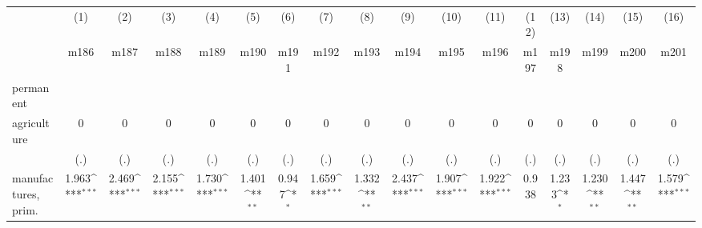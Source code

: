 {
\def\sym#1{\ifmmode^{#1}\else\(^{#1}\)\fi}
\begin{tabular}{l*{16}{c}}
\hline\hline
                    &\multicolumn{1}{c}{(1)}&\multicolumn{1}{c}{(2)}&\multicolumn{1}{c}{(3)}&\multicolumn{1}{c}{(4)}&\multicolumn{1}{c}{(5)}&\multicolumn{1}{c}{(6)}&\multicolumn{1}{c}{(7)}&\multicolumn{1}{c}{(8)}&\multicolumn{1}{c}{(9)}&\multicolumn{1}{c}{(10)}&\multicolumn{1}{c}{(11)}&\multicolumn{1}{c}{(12)}&\multicolumn{1}{c}{(13)}&\multicolumn{1}{c}{(14)}&\multicolumn{1}{c}{(15)}&\multicolumn{1}{c}{(16)}\\
                    &\multicolumn{1}{c}{m186}&\multicolumn{1}{c}{m187}&\multicolumn{1}{c}{m188}&\multicolumn{1}{c}{m189}&\multicolumn{1}{c}{m190}&\multicolumn{1}{c}{m191}&\multicolumn{1}{c}{m192}&\multicolumn{1}{c}{m193}&\multicolumn{1}{c}{m194}&\multicolumn{1}{c}{m195}&\multicolumn{1}{c}{m196}&\multicolumn{1}{c}{m197}&\multicolumn{1}{c}{m198}&\multicolumn{1}{c}{m199}&\multicolumn{1}{c}{m200}&\multicolumn{1}{c}{m201}\\
\hline
permanent           &                     &                     &                     &                     &                     &                     &                     &                     &                     &                     &                     &                     &                     &                     &                     &                     \\
agriculture         &           0         &           0         &           0         &           0         &           0         &           0         &           0         &           0         &           0         &           0         &           0         &           0         &           0         &           0         &           0         &           0         \\
                    &         (.)         &         (.)         &         (.)         &         (.)         &         (.)         &         (.)         &         (.)         &         (.)         &         (.)         &         (.)         &         (.)         &         (.)         &         (.)         &         (.)         &         (.)         &         (.)         \\
[1em]
manufactures, prim. &       1.963\sym{***}&       2.469\sym{***}&       2.155\sym{***}&       1.730\sym{***}&       1.401\sym{**} &       0.947\sym{*}  &       1.659\sym{***}&       1.332\sym{**} &       2.437\sym{***}&       1.907\sym{***}&       1.922\sym{***}&       0.938         &       1.233\sym{*}  &       1.230\sym{**} &       1.447\sym{**} &       1.579\sym{***}\\

\end{tabular}}

